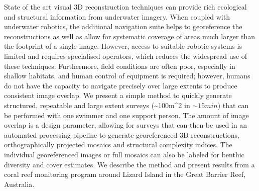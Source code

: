 
State of the art visual 3D reconstruction techniques can provide rich ecological and structural information from underwater imagery. When coupled with underwater robotics, the additional navigation suite helps to georeference the reconstructions as well as allow for systematic coverage of areas much larger than the footprint of a single image. However, access to suitable robotic systems is limited and requires specialised operators, which reduces the widespread use of these techniques. Furthermore, field conditions are often poor, especially in shallow habitats, and human control of equipment is required; however, humans do not have the capacity to navigate precisely over large extents to produce consistent image overlap.  We present a simple method to quickly generate structured, repeatable and large extent surveys (\sim{100m^{2}} in $\sim{15 min}$) that can be performed with one swimmer and one support person. The amount of image overlap is a design parameter, allowing for surveys that can then be used in an automated processing pipeline to generate georeferenced 3D reconstructions, orthographically projected mosaics and structural complexity indices. The individual georeferenced images or full mosaics can also be labeled for benthic diversity and cover estimates. We describe the method and present results from a coral reef monitoring program around Lizard Island in the Great Barrier Reef, Australia.
  
  